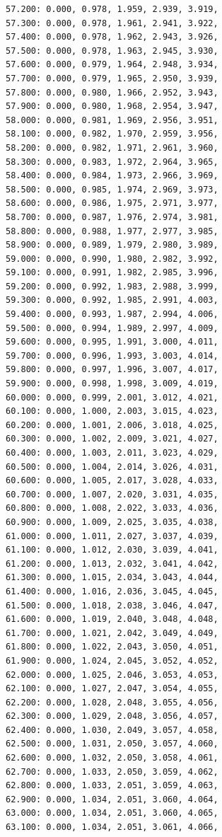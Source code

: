 \documentclass[12pt, a4paper]{article}
\begin{document}
\begin{scriptsize}
\begin{ttfamily}
\begin{lstlisting}
57.200: 0.000, 0.978, 1.959, 2.939, 3.919, 
57.300: 0.000, 0.978, 1.961, 2.941, 3.922, 
57.400: 0.000, 0.978, 1.962, 2.943, 3.926, 
57.500: 0.000, 0.978, 1.963, 2.945, 3.930, 
57.600: 0.000, 0.979, 1.964, 2.948, 3.934, 
57.700: 0.000, 0.979, 1.965, 2.950, 3.939, 
57.800: 0.000, 0.980, 1.966, 2.952, 3.943, 
57.900: 0.000, 0.980, 1.968, 2.954, 3.947, 
58.000: 0.000, 0.981, 1.969, 2.956, 3.951, 
58.100: 0.000, 0.982, 1.970, 2.959, 3.956, 
58.200: 0.000, 0.982, 1.971, 2.961, 3.960, 
58.300: 0.000, 0.983, 1.972, 2.964, 3.965, 
58.400: 0.000, 0.984, 1.973, 2.966, 3.969, 
58.500: 0.000, 0.985, 1.974, 2.969, 3.973, 
58.600: 0.000, 0.986, 1.975, 2.971, 3.977, 
58.700: 0.000, 0.987, 1.976, 2.974, 3.981, 
58.800: 0.000, 0.988, 1.977, 2.977, 3.985, 
58.900: 0.000, 0.989, 1.979, 2.980, 3.989, 
59.000: 0.000, 0.990, 1.980, 2.982, 3.992, 
59.100: 0.000, 0.991, 1.982, 2.985, 3.996, 
59.200: 0.000, 0.992, 1.983, 2.988, 3.999, 
59.300: 0.000, 0.992, 1.985, 2.991, 4.003, 
59.400: 0.000, 0.993, 1.987, 2.994, 4.006, 
59.500: 0.000, 0.994, 1.989, 2.997, 4.009, 
59.600: 0.000, 0.995, 1.991, 3.000, 4.011, 
59.700: 0.000, 0.996, 1.993, 3.003, 4.014, 
59.800: 0.000, 0.997, 1.996, 3.007, 4.017, 
59.900: 0.000, 0.998, 1.998, 3.009, 4.019, 
60.000: 0.000, 0.999, 2.001, 3.012, 4.021, 
60.100: 0.000, 1.000, 2.003, 3.015, 4.023, 
60.200: 0.000, 1.001, 2.006, 3.018, 4.025, 
60.300: 0.000, 1.002, 2.009, 3.021, 4.027, 
60.400: 0.000, 1.003, 2.011, 3.023, 4.029, 
60.500: 0.000, 1.004, 2.014, 3.026, 4.031, 
60.600: 0.000, 1.005, 2.017, 3.028, 4.033, 
60.700: 0.000, 1.007, 2.020, 3.031, 4.035, 
60.800: 0.000, 1.008, 2.022, 3.033, 4.036, 
60.900: 0.000, 1.009, 2.025, 3.035, 4.038, 
61.000: 0.000, 1.011, 2.027, 3.037, 4.039, 
61.100: 0.000, 1.012, 2.030, 3.039, 4.041, 
61.200: 0.000, 1.013, 2.032, 3.041, 4.042, 
61.300: 0.000, 1.015, 2.034, 3.043, 4.044, 
61.400: 0.000, 1.016, 2.036, 3.045, 4.045, 
61.500: 0.000, 1.018, 2.038, 3.046, 4.047, 
61.600: 0.000, 1.019, 2.040, 3.048, 4.048, 
61.700: 0.000, 1.021, 2.042, 3.049, 4.049, 
61.800: 0.000, 1.022, 2.043, 3.050, 4.051, 
61.900: 0.000, 1.024, 2.045, 3.052, 4.052, 
62.000: 0.000, 1.025, 2.046, 3.053, 4.053, 
62.100: 0.000, 1.027, 2.047, 3.054, 4.055, 
62.200: 0.000, 1.028, 2.048, 3.055, 4.056, 
62.300: 0.000, 1.029, 2.048, 3.056, 4.057, 
62.400: 0.000, 1.030, 2.049, 3.057, 4.058, 
62.500: 0.000, 1.031, 2.050, 3.057, 4.060, 
62.600: 0.000, 1.032, 2.050, 3.058, 4.061, 
62.700: 0.000, 1.033, 2.050, 3.059, 4.062, 
62.800: 0.000, 1.033, 2.051, 3.059, 4.063, 
62.900: 0.000, 1.034, 2.051, 3.060, 4.064, 
63.000: 0.000, 1.034, 2.051, 3.060, 4.065, 
63.100: 0.000, 1.034, 2.051, 3.061, 4.066, 

\end{lstlisting}
\end{ttfamily}
\end{scriptsize}
\end{document}
